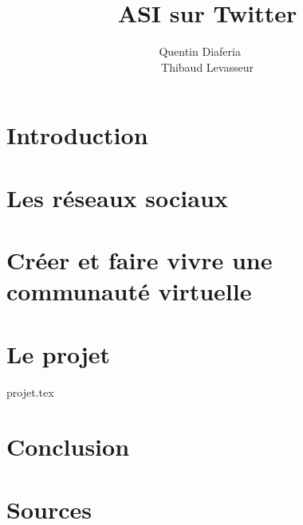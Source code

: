 \documentclass[a4paper,12pt]{article}
\title{ASI sur Twitter}
\author{Quentin Diaferia ~~\\ Thibaud Levasseur}
\begin{document}
\maketitle
\newpage
\tableofcontents
\newpage
\section{Introduction}

\newpage
\section{Les réseaux sociaux}

\newpage
\section{Créer et faire vivre une communauté virtuelle}

\newpage
\section{Le projet}
 {projet.tex}
\newpage
\section{Conclusion}

\newpage
\section{Sources}

\end{document}
